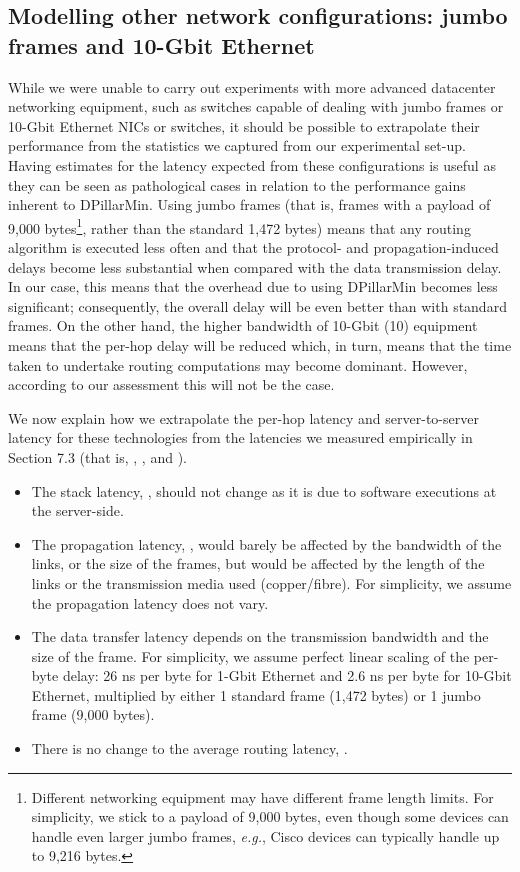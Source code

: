 \documentclass{article}
\newcounter{fig}
\begin{document}
\subsection{Modelling other network configurations: jumbo frames and 10-Gbit Ethernet}
While we were unable to carry out experiments with more advanced datacenter
networking equipment, such as switches capable of dealing with jumbo frames or
10-Gbit Ethernet NICs or switches, it should be possible to extrapolate their
performance from the statistics we captured from our experimental set-up. Having
estimates for the latency expected from these configurations is useful as they
can be seen as pathological cases in relation to the performance gains inherent
to DPillarMin. Using jumbo frames (that is, frames with a payload of 9,000
bytes\footnote{Different networking equipment may have different frame length
  limits. For simplicity, we stick to a payload of 9,000 bytes, even though some
  devices can handle even larger jumbo frames, \emph{e.g.}, Cisco devices can
  typically handle up to 9,216 bytes.}, rather than the standard 1,472 bytes)
means that any routing algorithm is executed less often and that the protocol-
and propagation-induced delays become less substantial when compared with the
data transmission delay. In our case, this means that the overhead due to using
DPillarMin becomes less significant; consequently, the overall delay will be
even better than with standard frames. On the other hand, the higher bandwidth
of 10-Gbit (10) equipment means that the per-hop delay will be reduced
which, in turn, means that the time taken to undertake routing computations may
become dominant. However, according to our assessment this will not be the case.

We now explain how we extrapolate the per-hop latency and server-to-server latency for these technologies from the latencies we measured empirically in Section 7.3 (that is, , ,  and ).
\begin{itemize}
	\item The stack latency, , should not change as it is due to software executions at the server-side. 
	\item The propagation latency, , would barely be affected by the bandwidth of the links, or the size of the frames, but would be affected by the length of the links or the transmission media used (copper/fibre). For simplicity, we assume the propagation latency does not vary.
	\item The data transfer latency depends on the transmission bandwidth and the size of the frame. For simplicity, we assume perfect linear scaling of the per-byte delay: 26 ns per byte for 1-Gbit Ethernet and 2.6 ns per byte for 10-Gbit Ethernet, multiplied by either 1 standard frame (1,472 bytes) or 1 jumbo frame (9,000 bytes).
	\item There is no change to the average routing latency, .
\end{itemize}
\end{document}

